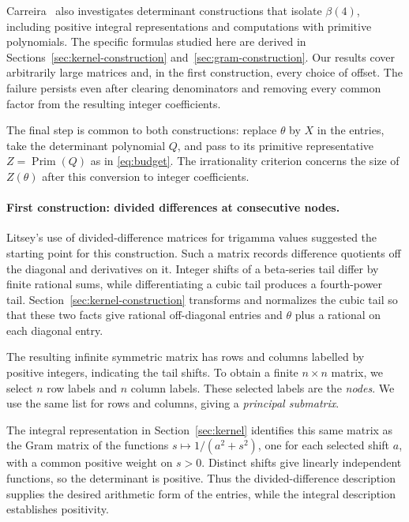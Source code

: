 \documentclass[11pt]{article}
\theoremstyle{definition}
\theoremstyle{remark}
\numberwithin{equation}{section}
\newcommand{\PP}{\operatorname{Prim}}
\begin{document}
Carreira~\cite[Sections~5--6 and~11--12]{Carreira} also investigates
determinant constructions that isolate $\beta(4)$, including positive
integral representations and computations with primitive polynomials.
The specific formulas studied here are derived in
Sections~\ref{sec:kernel-construction} and~\ref{sec:gram-construction}.
Our results cover arbitrarily large matrices and, in the first
construction, every choice of offset. The failure persists even after
clearing denominators and removing every common factor from the
resulting integer coefficients.

The final step is common to both constructions: replace $\theta$ by
$X$ in the entries, take the determinant polynomial $Q$, and pass to
its primitive representative $Z=\PP(Q)$ as in \eqref{eq:budget}.
The irrationality criterion concerns the size of $Z(\theta)$ after
this conversion to integer coefficients.

\paragraph{First construction: divided differences at consecutive nodes.}
Litsey's use of divided-difference matrices for trigamma values
\cite[Section~2.1]{Litsey} suggested the starting point for this
construction. Such a matrix records difference quotients off the
diagonal and derivatives on it. Integer shifts of a beta-series tail
differ by finite rational sums, while differentiating a cubic tail
produces a fourth-power tail. Section~\ref{sec:kernel-construction}
transforms and normalizes the cubic tail so that these two facts give
rational off-diagonal entries and $\theta$ plus a rational on each
diagonal entry.

The resulting infinite symmetric matrix has rows and columns labelled
by positive integers, indicating the tail shifts. To obtain a finite
$n\times n$ matrix, we select $n$ row labels and $n$ column labels.
These selected labels are the \emph{nodes}. We use the same list for
rows and columns, giving a \emph{principal submatrix}.

The integral representation in Section~\ref{sec:kernel} identifies
this same matrix as the Gram matrix of the functions
$s\mapsto 1/(a^2+s^2)$, one for each selected shift $a$, with a
common positive weight on $s>0$. Distinct shifts give linearly
independent functions, so the determinant is positive. Thus the
divided-difference description supplies the desired arithmetic form
of the entries, while the integral description establishes positivity.
\end{document}
